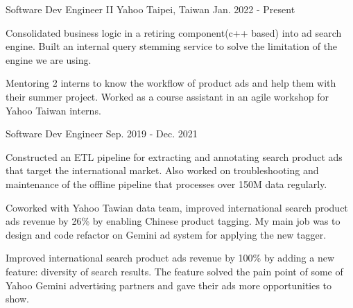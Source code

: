 

\begin{cventries}

  \cventry
    {Software Dev Engineer II} %
    {Yahoo} %
    {Taipei, Taiwan} %
    {Jan. 2022 - Present} %
    {
      \begin{cvitems} %
      \item {Consolidated business logic in a retiring component(c++ based) into ad search engine. Built an internal query stemming service to solve the limitation of the engine we are using.}
        \item {Mentoring 2 interns to know the workflow of product ads and help them with their summer project. Worked as a course assistant in an agile workshop for Yahoo Taiwan interns.}
      \end{cvitems}
    }

  \cventry
    {Software Dev Engineer} %
    {} %
    {} %
    {Sep. 2019 - Dec. 2021} %
    {
      \begin{cvitems} %
        \item {Constructed an ETL pipeline for extracting and annotating search product ads that target the international market. Also worked on troubleshooting and maintenance of the offline pipeline that processes over 150M data regularly.}
        \item {Coworked with Yahoo Tawian data team, improved international search product ads revenue by 26\% by enabling Chinese product tagging. My main job was to design and code refactor on Gemini ad system for applying the new tagger.}
        \item {Improved international search product ads revenue by 100\% by adding a new feature: diversity of search results. The feature solved the pain point of some of Yahoo Gemini advertising partners and gave their ads more opportunities to show.}
      \end{cvitems}
    }


\end{cventries}
